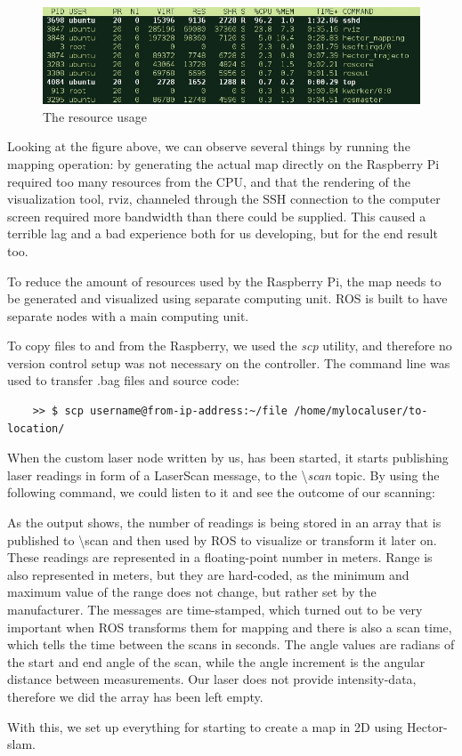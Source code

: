 \begin{figure}[H]
	\centering
	\includegraphics[width=.8\linewidth]{images/rvisScreenshotCropped.jpg}
	\caption{The resource usage}
\end{figure}

Looking at the figure above, we can observe several things by running the mapping operation: by generating the actual map directly on the Raspberry Pi required too many resources from the CPU, and that the rendering of the visualization tool, rviz, channeled through the SSH connection to the computer screen required more bandwidth than there could be supplied. This caused a terrible lag and a bad experience both for us developing, but for the end result too.

To reduce the amount of resources used by the Raspberry Pi, the map needs to be generated and visualized using separate computing unit. ROS is built to have separate nodes with a main computing unit.

To copy files to and from the Raspberry, we used the \textit{scp} utility, and therefore no version control setup was not necessary on the controller. The command line was used to transfer .bag files and source code:
\begin{lstlisting}
	>> $ scp username@from-ip-address:~/file /home/mylocaluser/to-location/
\end{lstlisting}

When the custom laser node written by us, has been started, it starts publishing laser readings in form of a LaserScan message, to the \textbackslash\textit{scan} topic. By using the following command, we could listen to it and see the outcome of our scanning:



As the output shows, the number of readings is being stored in an array that is published to \textbackslash scan and then used by ROS to visualize or transform it later on. These readings are represented in a floating-point number in meters. Range is also represented in meters, but they are hard-coded, as the minimum and maximum value of the range does not change, but rather set by the manufacturer. The messages are time-stamped, which turned out to be very important when ROS transforms them for mapping and there is also a scan time, which tells the time between the scans in seconds. The angle values are radians of the start and end angle of the scan, while the angle increment is the angular distance between measurements. Our laser does not provide intensity-data, therefore we did the array has been left empty.

With this, we set up everything for starting to create a map in 2D using Hector-slam.